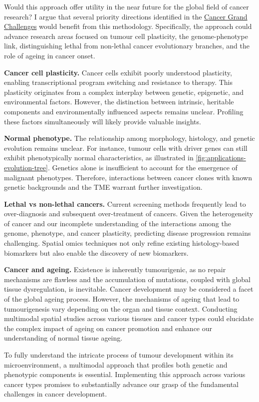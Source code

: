 Would this approach offer utility in the near future for the global field of cancer research? I argue that several priority directions identified in the \href{https://cancergrandchallenges.org/}{Cancer Grand Challenges} would benefit from this methodology. Specifically, the approach could advance research areas focused on tumour cell plasticity, the genome-phenotype link, distinguishing lethal from non-lethal cancer evolutionary branches, and the role of ageing in cancer onset.

\textbf{Cancer cell plasticity.} Cancer cells exhibit poorly understood plasticity, enabling transcriptional program switching and resistance to therapy. This plasticity originates from a complex interplay between genetic, epigenetic, and environmental factors. However, the distinction between intrinsic, heritable components and environmentally influenced aspects remains unclear. Profiling these factors simultaneously will likely provide valuable insights.

\textbf{Normal phenotype.} The relationship among morphology, histology, and genetic evolution remains unclear. For instance, tumour cells with driver genes can still exhibit phenotypically normal characteristics, as illustrated in \cref{fig:applications-evolution-tree}. Genetics alone is insufficient to account for the emergence of malignant phenotypes. Therefore, interactions between cancer clones with known genetic backgrounds and the \ac{TME} warrant further investigation.

\textbf{Lethal vs non-lethal cancers.} Current screening methods frequently lead to over-diagnosis and subsequent over-treatment of cancers. Given the heterogeneity of cancer and our incomplete understanding of the interactions among the genome, phenotype, and cancer plasticity, predicting disease progression remains challenging. Spatial omics techniques not only refine existing histology-based biomarkers but also enable the discovery of new biomarkers.

\textbf{Cancer and ageing.} Existence is inherently tumourigenic, as no repair mechanisms are flawless and the accumulation of mutations, coupled with global tissue dysregulation, is inevitable. Cancer development may be considered a facet of the global ageing process. However, the mechanisms of ageing that lead to tumourigenesis vary depending on the organ and tissue context. Conducting multimodal spatial studies across various tissues and cancer types could elucidate the complex impact of ageing on cancer promotion and enhance our understanding of normal tissue ageing.

To fully understand the intricate process of tumour development within its microenvironment, a multimodal approach that profiles both genetic and phenotypic components is essential. Implementing this approach across various cancer types promises to substantially advance our grasp of the fundamental challenges in cancer development.